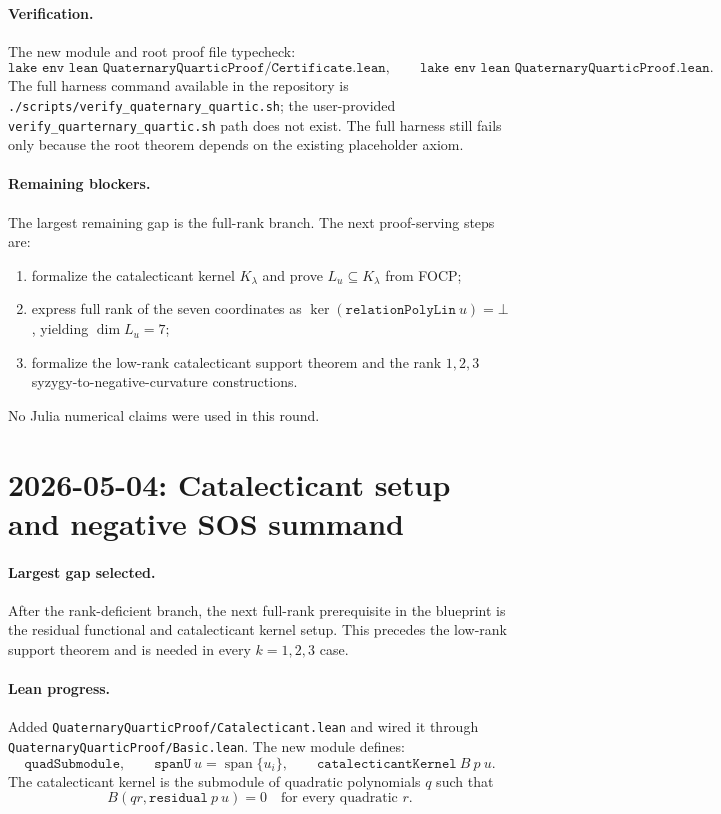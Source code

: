 \documentclass[11pt]{article}
\begin{document}
\paragraph{Verification.}
The new module and root proof file typecheck:
\[
\texttt{lake env lean QuaternaryQuarticProof/Certificate.lean},\qquad
\texttt{lake env lean QuaternaryQuarticProof.lean}.
\]
The full harness command available in the repository is
\texttt{./scripts/verify\_quaternary\_quartic.sh}; the user-provided
\texttt{verify\_quarternary\_quartic.sh} path does not exist.  The full harness
still fails only because the root theorem depends on the existing placeholder
axiom.

\paragraph{Remaining blockers.}
The largest remaining gap is the full-rank branch.  The next proof-serving
steps are:
\begin{enumerate}
\item formalize the catalecticant kernel \(K_\lambda\) and prove
  \(L_u\subseteq K_\lambda\) from FOCP;
\item express full rank of the seven coordinates as
  \(\ker(\texttt{relationPolyLin}\ u)=\bot\), yielding \(\dim L_u=7\);
\item formalize the low-rank catalecticant support theorem and the rank
  \(1,2,3\) syzygy-to-negative-curvature constructions.
\end{enumerate}

No Julia numerical claims were used in this round.

\section*{2026-05-04: Catalecticant setup and negative SOS summand}

\paragraph{Largest gap selected.}
After the rank-deficient branch, the next full-rank prerequisite in the
blueprint is the residual functional and catalecticant kernel setup.  This
precedes the low-rank support theorem and is needed in every \(k=1,2,3\)
case.

\paragraph{Lean progress.}
Added \texttt{QuaternaryQuarticProof/Catalecticant.lean} and wired it through
\texttt{QuaternaryQuarticProof/Basic.lean}.  The new module defines:
\[
\texttt{quadSubmodule},\qquad
\texttt{spanU}\ u=\operatorname{span}\{u_i\},\qquad
\texttt{catalecticantKernel}\ B\ p\ u.
\]
The catalecticant kernel is the submodule of quadratic polynomials \(q\) such
that
\[
  B(qr,\texttt{residual}\ p\ u)=0
  \quad\text{for every quadratic }r.
\]
\end{document}
